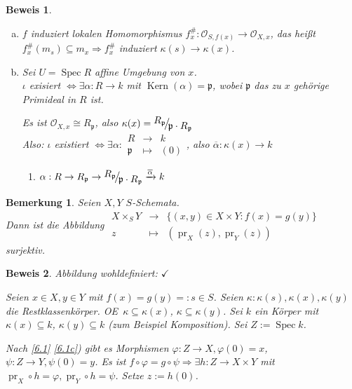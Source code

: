 \documentclass[paper = A4, fontsize=12pt, numbers=noendperiod, chapterprefix=true]{scrbook}
\theoremstyle{break}
\newtheorem{Bem}[Def]{Bemerkung}
\theoremstyle{nonumberbreak}
\newtheorem{bew}{Beweis}
\theoremstyle{nonumberplain}
\newcommand{\quot}[1]{\textrm{\glqq}{#1}\textrm{\grqq}}
\newenvironment{twosidedproof}{\begin{enumerate}[\quot{$\Rightarrow$}:]}{\end{enumerate}}
\newcommand{\proofreverse}{\item[\quot{$\Leftarrow$}:]}
\DeclareMathOperator{\Spec}{Spec}
\DeclareMathOperator{\Kern}{Kern}
\DeclareMathOperator{\pr}{pr}
\newcommand{\calO}{\mathcal{O}}
\newcommand{\p}{\mathfrak{p}} %
\newcommand{\X}{\times}
\newcommand{\FakRaum}[2]{
  \raisebox{0.7ex}{\ensuremath{#1}}
  \ensuremath{\mkern-3mu}\big/\ensuremath{\mkern-3mu}
  \raisebox{-0.6ex}{\ensuremath{#2}}}
\renewcommand{\OE}{O\!\!E~}
\begin{document}
\begin{bew}\begin{enumerate}[a)]
\item[b)]
	$f$ induziert lokalen Homomorphismus $f_x^\#: \calO_{S, f(x)} \to \calO_{X,x}$, das hei\ss t $f_x^\#(m_s) \subseteq m_x \Rightarrow f_x^\#$ induziert $\kappa(s) \to \kappa(x)$.
\item[c)]
	Sei $U = \Spec R$ affine Umgebung von $x$.\\
	$\iota$ exisiert $\Leftrightarrow\exists \alpha: R \to k$ mit $\Kern(\alpha) = \p$, wobei $\p$ das zu $x$ geh\"orige Primideal in $R$ ist.
	
	Es ist $\calO_{X, x} \cong R_{\p}$, also $\kappa(x) = \FakRaum{R_{\p}}{\p \cdot R_{\p}}$\\
	\emph{Also:} $\iota$ existiert $\Leftrightarrow \exists  \alpha: \begin{array}{ccc}R &\to& k \\ \p &\mapsto& (0)\end{array}$, also $\overline \alpha: \kappa(x) \to k$
	\begin{twosidedproof}\proofreverse $\alpha: R \to R_\p \to \FakRaum{R_{\p}}{\p \cdot R_{\p}} \xrightarrow{\overline \alpha} k$
\end{twosidedproof}\end{enumerate}\end{bew}

\begin{Bem}\label{6.2}
Seien $X, Y$ $S$-Schemata.\\
Dann ist die Abbildung $\begin{array}{ccc} X \X_S Y &\to& \{(x,y) \in X \X Y: f(x)=g(y)\} \\ z &\mapsto& (\pr_X(z), \pr_Y(z))\end{array}$ surjektiv.
\begin{center}
\end{center}
\end{Bem}

\begin{bew}
Abbildung wohldefiniert: $\checkmark$

Seien $x\in X, y \in Y$ mit $f(x) = g(y) =: s \in S$. Seien $\kappa: \kappa(s), \kappa(x), \kappa(y)$ die Restklassenk\"orper. \OE $\kappa \subseteq \kappa(x)$, $\kappa \subseteq \kappa(y)$. Sei $k$ ein K\"orper mit $\kappa(x) \subseteq k$, $\kappa(y) \subseteq k$ (zum Beispiel Komposition). Sei $Z:= \Spec k$.

Nach \ref{6.1} \ref{6.1c}) gibt es Morphismen $\varphi: Z \to X, \varphi(0) = x$, $\psi: Z \to Y, \psi(0) = y$. Es ist $f \circ \varphi = g \circ \psi \Rightarrow  \exists h: Z \to X \X Y$ mit $\pr_X \circ h = \varphi, \pr_Y \circ h = \psi$. Setze $z := h(0)$.
\end{bew}
\end{document}
